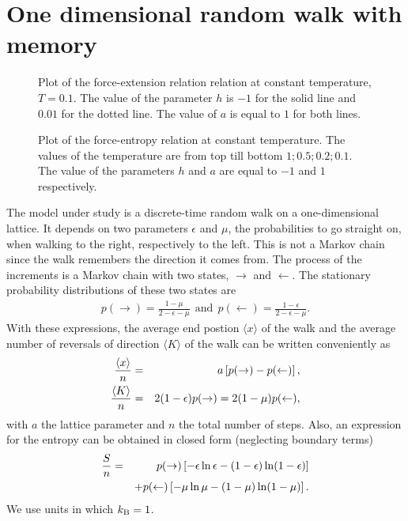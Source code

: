 \documentclass[doublecol,figures]{epl2}
\begin{document}
\section{One dimensional random walk with memory}
\begin{figure}
\caption{Plot of the force-extension relation relation
at constant temperature, $T=0.1$. The value of the parameter $h$ is $-1$ for the solid
line and $0.01$ for the dotted line. The value of $a$ is equal to $1$ for both lines.}
\label{forceexten}
\end{figure}
\begin{figure}
\caption{Plot of the force-entropy relation at
constant temperature. The values of the temperature are from top till bottom 
$1;0.5;0.2;0.1$. The value of the parameters $h$ and $a$ are equal to $-1$ and $1$ respectively.}
\label{forceentro}
\end{figure}
The model under study is a discrete-time random walk on a one-dimensional
lattice. It depends on two parameters $\epsilon$ and $\mu$, the probabilities to
go straight on, when walking to the right, respectively to the left. This is not
a Markov chain since the walk remembers the direction it comes from. The process
of the increments is a Markov chain with two states, $\rightarrow$ and
$\leftarrow$. The stationary probability distributions of these two states are
\cite{referee9}
\begin{eqnarray}
p(\rightarrow)=\frac{1-\mu}{2-\epsilon-\mu}\ \ \textrm{and}\ \ p(\leftarrow)=\frac{1-\epsilon}{2-\epsilon-\mu}.
\end{eqnarray}
With these expressions, the average end postion $\langle x\rangle$ of the walk and the average number of reversals of direction $\langle K\rangle$ of the walk can be written conveniently as \cite{referee10,referee11}
\begin{eqnarray}\label{gem}
\frac{\langle
x\rangle}{n}&=&a\left[p(\rightarrow)-p(\leftarrow)\right],
\cr
\frac{\langle K\rangle}{n}&=&2(1-\epsilon)p(\rightarrow)=2(1-\mu)p(\leftarrow),
\end{eqnarray}
with $a$ the lattice parameter and $n$ the total number of steps. Also, an expression for the entropy can be obtained in closed form (neglecting boundary terms) \cite{referee10,referee11}
\begin{eqnarray}
\frac Sn&=&p(\rightarrow)\left[-\epsilon\ln\epsilon-(1-\epsilon)\ln(1-\epsilon)\right
]
\cr
&&+p(\leftarrow)\left[-\mu\ln\mu-(1-\mu)\ln(1-\mu)\right].
\end{eqnarray}
We use units in which $k_\textrm B=1$.
\end{document}
